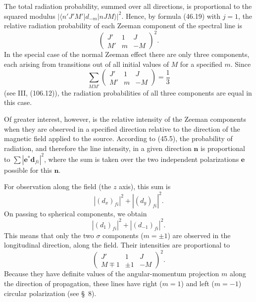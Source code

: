 The total radiation probability, summed over all directions, is proportional to the squared modulus $|\langle n'J'M'|d_{-m}|nJM\rangle|^2$. Hence, by formula (46.19) with $j=1$, the relative radiation probability of each Zeeman component of the spectral line is
\begin{equation}
\begin{pmatrix}J'&1&J\\M'&m&-M\end{pmatrix}^{\!2}.
\tag{51.5}
\end{equation}
In the special case of the normal Zeeman effect there are only three components, each arising from transitions out of all initial values of $M$ for a specified $m$. Since
\begin{equation}
\sum_{MM'}\begin{pmatrix}J'&1&J\\M'&m&-M\end{pmatrix}=\frac13
\tag{51.6}
\end{equation}
(see III, (106.12)), the radiation probabilities of all three components are equal in this case.

Of greater interest, however, is the relative intensity of the Zeeman components when they are observed in a specified direction relative to the direction of the magnetic field applied to the source. According to (45.5), the probability of
radiation, and therefore the line intensity, in a given direction $\mathbf n$ is proportional to $\sum|\mathbf e^*\mathbf d_{fi}|^2$, where the sum is taken over the two independent polarizations $\mathbf e$ possible for this $\mathbf n$.

For observation along the field (the $z$ axis), this sum is
\[
|(d_x)_{fi}|^2+|(d_y)_{fi}|^2.
\]
On passing to spherical components, we obtain
\[
|(d_1)_{fi}|^2+|(d_{-1})_{fi}|^2.
\]
This means that only the two $\sigma$ components ($m=\pm1$) are observed in the longitudinal direction, along the field. Their intensities are proportional to
\begin{equation}
\begin{pmatrix}J'&1&J\\M\mp1&\pm1&-M\end{pmatrix}^{\!2}.
\tag{51.7}
\end{equation}
Because they have definite values of the angular-momentum projection $m$ along the direction of propagation, these lines have right ($m=1$) and left ($m=-1$) circular polarization (see \S~8).

